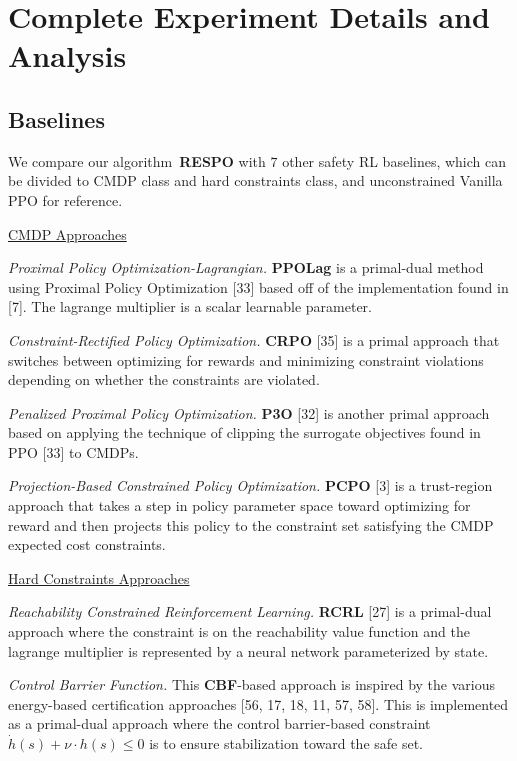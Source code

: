 \documentclass{article}
\theoremstyle{definition}
\begin{document}
\section{Complete Experiment Details and Analysis}

\subsection{Baselines}
We compare our algorithm~\textbf{RESPO} with $7$ other safety RL baselines, which can be divided to CMDP class and hard constraints class, and unconstrained Vanilla PPO for reference.

\underline{CMDP Approaches}

\emph{Proximal Policy Optimization-Lagrangian.} \textbf{PPOLag} is a primal-dual method using Proximal Policy Optimization [33] based off of the implementation found in [7]. The lagrange multiplier is a scalar learnable parameter.

\emph{Constraint-Rectified Policy Optimization.} \textbf{CRPO} [35] is a primal approach that switches between optimizing for rewards and minimizing constraint violations depending on whether the constraints are violated.

\emph{Penalized Proximal Policy Optimization.} \textbf{P3O} [32] is another primal approach based on applying the technique of clipping the surrogate objectives found in PPO [33] to CMDPs.

\emph{Projection-Based Constrained Policy Optimization.} \textbf{PCPO} [3] is a trust-region approach that takes a step in policy parameter space toward optimizing for reward and then projects this policy to the constraint set satisfying the CMDP expected cost constraints.

\underline{Hard Constraints Approaches}

\emph{Reachability Constrained Reinforcement Learning.} \textbf{RCRL} [27] is a primal-dual approach where the constraint is on the reachability value function and the lagrange multiplier is represented by a neural network parameterized by state.

\emph{Control Barrier Function.} This \textbf{CBF}-based approach is inspired by the various energy-based certification approaches [56, 17, 18, 11, 57, 58]. This is implemented as a primal-dual approach where the control barrier-based constraint $\dot{h}(s) + \nu\cdot h(s)\leq 0$ is to ensure stabilization toward the safe set.
\end{document}
